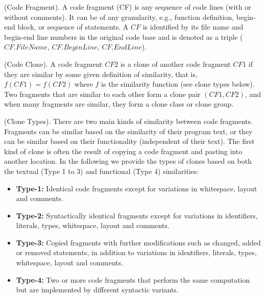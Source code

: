 \documentclass{acm_proc_article-sp}
\begin{document}
\begin{definition}
(Code Fragment). A code fragment (CF) is any sequence of code lines (with or without comments). It can be of any granularity, e.g., function
definition, begin-end block, or sequence of statements. A $CF$ is identified by its file name and begin-end line numbers in the original code base
and is denoted as a triple ($CF.FileName$, $CF.BeginLine$, $CF.EndLine$).
\end{definition}

\begin{definition}
(Code Clone). A code fragment $CF2$ is a clone of another code fragment $CF1$ if they are similar by some given definition of similarity, that is, 
$f(CF1) = f(CF2)$ where $f$ is the similarity function (see clone types below). Two fragments that are similar to each other form a clone pair
$(CF1, CF2)$, and when many fragments are similar, they form a clone class or clone group.
\end{definition}

\begin{definition}
(Clone Types). There are two main kinds of similarity between code fragments. Fragments can be similar based on the similarity of their program text,
or they can be similar based on their functionality (independent of their text). The first kind of clone is often the result of copying a code fragment and
pasting into another location. In the following we provide the types of clones based on both the textual (Type 1 to 3)\cite{bellon} and functional (Type 4)\cite{gabel, komondoor} similarities:

\begin{itemize}
\item {\bf Type-1:} Identical code fragments except for variations in whitespace, layout and comments.
\item {\bf Type-2:} Syntactically identical fragments except for variations in identifiers, literals, types, whitespace, layout and comments.
\item {\bf Type-3:} Copied fragments with further modifications such as changed, added or removed statements, in addition to variations in identifiers, literals, types, whitespace, layout and comments.
\item {\bf Type-4:} Two or more code fragments that perform the same computation but are implemented by different syntactic variants.
\end{itemize}
\end{definition}
\end{document}
